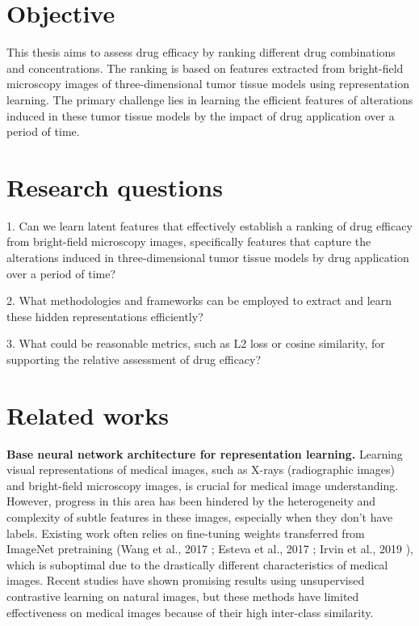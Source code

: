 \documentclass[12pt,twoside,a4paper,parskip]{scrbook} %
\begin{document}
\chapter{Objective}\label{ch:Objective}
This thesis aims to assess drug efficacy by ranking different drug combinations and concentrations. The ranking is based on features extracted from bright-field microscopy images of  three-dimensional tumor tissue models using representation learning. The primary challenge lies in learning the efficient features of alterations induced in these tumor tissue models by the impact of drug application over a period of time.
\let\cleardoublepage\clearpage
\chapter{Research questions}\label{ch:Research questions}

1. Can we learn latent features that effectively establish a ranking of drug efficacy from bright-field microscopy images, specifically features that capture the alterations induced in three-dimensional tumor tissue models by drug application over a period of time?

2. What methodologies and frameworks can be employed to extract and learn these hidden representations efficiently?

3. What could be reasonable metrics, such as L2 loss or cosine similarity, for supporting the relative assessment of drug efficacy?

\chapter{Related works}\label{ch:Related works}
\textbf{Base neural network architecture for representation learning.} Learning visual representations of medical images, such as X-rays (radiographic images) and bright-field microscopy images, is crucial for medical image understanding. However, progress in this area has been hindered by the heterogeneity and complexity of subtle features in these images, especially when they don't have labels. Existing work often relies on fine-tuning weights transferred from ImageNet pretraining (Wang et al., 2017 \cite{8099852} ; Esteva et al., 2017 \cite{Esteva2017Dermatologist} ; Irvin et al., 2019 \cite{irvin2019chexpert} ), which is suboptimal due to the drastically different characteristics of medical images. Recent studies have shown promising results using unsupervised contrastive learning on natural images, but these methods have limited effectiveness on medical images because of their high inter-class similarity.
\end{document}
